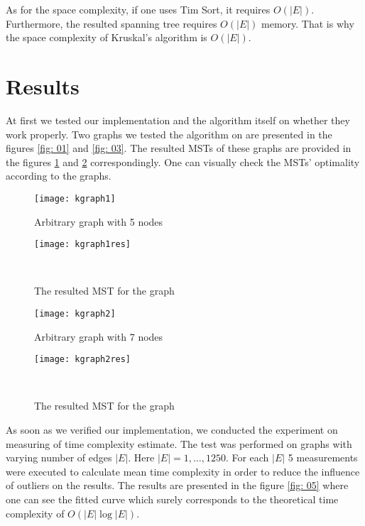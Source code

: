 \documentclass[12pt, bachelor, substylefile = algo_title.rtx]{disser}
\theoremstyle{definition}
\begin{document}
As for the space complexity, if one uses Tim Sort, it requires $O(|E|)$. Furthermore, the resulted spanning tree requires $O(|E|)$ memory. That is why the space complexity of Kruskal's algorithm is $O(|E|)$.

\section{Results}
At first we tested our implementation and the algorithm itself on whether they work properly. Two graphs we tested the algorithm on are presented in the figures \ref{fig: 01} and \ref{fig: 03}. The resulted MSTs of these graphs are provided in the figures \ref{fig: 02} and \ref{fig: 04} correspondingly. One can visually check the MSTs' optimality according to the graphs. 

\begin{figure}[!h]
   \begin{minipage}{0.48\textwidth}
     \centering
     \texttt{[image: kgraph1]}
	\caption{Arbitrary graph with 5 nodes}
	\label{fig: 01}
   \end{minipage}\hfill
   \begin{minipage}{0.48\textwidth}
     \centering
     \texttt{[image: kgraph1res]}
	\caption{The resulted MST for the graph}
	\label{fig: 02}
   \end{minipage}\\
\end{figure}

\begin{figure}[!h]
   \begin{minipage}{0.48\textwidth}
     \centering
     \texttt{[image: kgraph2]}
	\caption{Arbitrary graph with 7 nodes}
	\label{fig: 03}
   \end{minipage}\hfill
   \begin{minipage}{0.48\textwidth}
     \centering
     \texttt{[image: kgraph2res]}
	\caption{The resulted MST for the graph}
	\label{fig: 04}
   \end{minipage}\\
\end{figure}

As soon as we verified our implementation, we conducted the experiment on measuring of time complexity estimate. The test was performed on graphs with varying number of edges $|E|$. Here $|E| = 1,\dots,1250$. For each $|E|$ 5 measurements were executed to calculate mean time complexity in order to reduce the influence of outliers on the results. The results are presented in the figure \ref{fig: 05} where one can see the fitted curve which surely corresponds to the theoretical time complexity of $O(|E|\log |E|)$.
\end{document}
